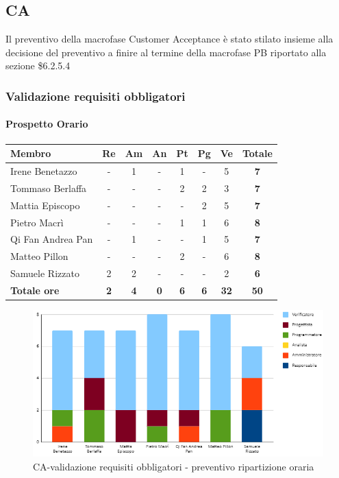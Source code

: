 \subsection{CA}
Il preventivo della macrofase Customer Acceptance è stato stilato insieme alla decisione del preventivo a finire al termine della macrofase PB riportato alla sezione \$6.2.5.4
\subsubsection{Validazione requisiti obbligatori}
\paragraph{Prospetto Orario}
\begin{center}
	\renewcommand{\arraystretch}{1.8} %
	\begin{tabular}{ |m{10em}|c|c|c|c|c|c|c| }
	\hline
	\textbf{Membro} & \textbf{Re} & \textbf{Am} &  \textbf{An} &  \textbf{Pt} &  \textbf{Pg} &  \textbf{Ve} &  \textbf{Totale}\\
    \hline
    Irene Benetazzo   & - & 1 & - & 1 & - & 5 & \textbf{7} \\
    \hline
    Tommaso Berlaffa  & - & - & - & 2 & 2 & 3 & \textbf{7} \\
    \hline
    Mattia Episcopo   & - & - & - & - & 2 & 5 & \textbf{7} \\
    \hline
    Pietro Macrì      & - & - & - & 1 & 1 & 6 & \textbf{8} \\
    \hline
    Qi Fan Andrea Pan & - & 1 & - & - & 1 & 5 & \textbf{7} \\
    \hline
    Matteo Pillon     & - & - & - & 2 & - & 6 & \textbf{8} \\
    \hline
    Samuele Rizzato   & 2 & 2 & - & - & - & 2 & \textbf{6} \\
    \hline
    \textbf{Totale ore} & \textbf{2} & \textbf{4} &  \textbf{0} &  \textbf{6} &  \textbf{6} &  \textbf{32} &  \textbf{50}\\
    \hline
	\end{tabular}
\end{center}
\begin{figure}[H]
    \centering\includegraphics[width=\textwidth, height=\textheight, keepaspectratio]{images/preventivo/CA-obbligatori-orario.png}
    \caption{CA-validazione requisiti obbligatori - preventivo ripartizione oraria}
\end{figure}


